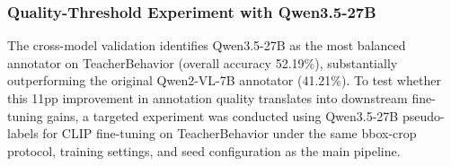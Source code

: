 \documentclass{ieeeaccess}
\begin{document}
\begin{table}[!t]
\caption{Ten-model cross-model validation on four key TeacherBehavior
categories illustrating the generational boundary (\textit{guide}) and the
task-level constraint (\textit{answer}).
Values are validation-set bbox-level accuracy (\%).
$n$ = number of validation crops.}
\label{tab:crossmodel_intent}
\centering
\scriptsize
{}
\normalsize
\end{table}

\subsubsection{Quality-Threshold Experiment with Qwen3.5-27B}

The cross-model validation identifies Qwen3.5-27B as the most balanced
annotator on TeacherBehavior (overall accuracy 52.19\%), substantially
outperforming the original Qwen2-VL-7B annotator (41.21\%).
To test whether this 11pp improvement in annotation quality translates
into downstream fine-tuning gains, a targeted experiment was conducted
using Qwen3.5-27B pseudo-labels for CLIP fine-tuning on TeacherBehavior
under the same bbox-crop protocol, training settings, and seed
configuration as the main pipeline.
\end{document}
